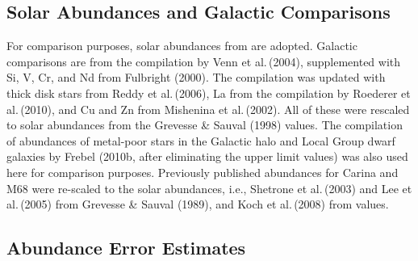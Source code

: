 \documentclass{emulateapj}
\newcommand\etal{{\rm et al.\,}}
\begin{document}
\subsection{Solar Abundances and Galactic Comparisons}

For comparison purposes, solar abundances from 
\citet{Asp09} are adopted.   Galactic comparisons 
are from the 
compilation by Venn \etal (2004), supplemented with 
Si, V, Cr, and Nd from Fulbright (2000).  The compilation
was updated with thick disk stars from Reddy \etal (2006),
La from the compilation by Roederer \etal (2010), 
and Cu and Zn from Mishenina \etal (2002).   All of
these were rescaled to \citet{Asp09} solar abundances
from the Grevesse \& Sauval (1998) values. 
The compilation of abundances of metal-poor stars in the
Galactic halo and Local Group dwarf galaxies by Frebel (2010b, 
after eliminating the upper limit values) was also used 
here for comparison purposes.   
% 
Previously published abundances for Carina and M68 were 
re-scaled to the \citet{Asp09} solar abundances, 
i.e., Shetrone \etal (2003) 
and Lee \etal (2005) from Grevesse \& Sauval (1989), and
Koch \etal (2008) from \citet{Asp05} values.



\subsection{Abundance Error Estimates \label{abuerr}}
\end{document}
